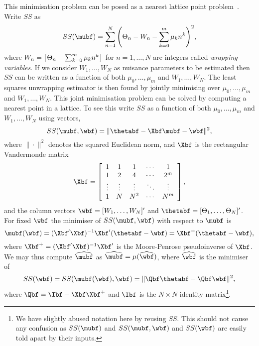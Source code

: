 \documentclass[journal]{IEEEtran}
\begin{document}
This minimisation problem can be posed as a nearest lattice point problem~\cite{McKilliam2009asilomar_polyest_lattice, McKilliam2010thesis}.  Write $SS$ as
\[
SS(\mubf) = \sum_{n=1}^{N}{ \left( \Theta_{n} - W_n - \sum_{k = 0}^{m}{\mu_k n^k} \right)^2 },
\]
where $W_n = {\left\lceil \Theta_{n} - \sum_{k = 0}^{m}{\mu_k n^k}  \right\rfloor}$ for $n = 1, \dots, N$ are integers called \emph{wrapping variables}.  If we consider $W_1,\dots,W_N$ as nuisance parameters to be estimated then $SS$ can be written as a function of both $\mu_0,\dots,\mu_m$ and $W_1,\dots,W_N$.  The least squares unwrapping estimator is then found by jointly minimising over $\mu_0,\dots,\mu_m$ and $W_1,\dots,W_N$.   This joint minimisation problem can be solved by computing a nearest point in a lattice.  To see this write $SS$ as a function of both $\mu_0,\dots,\mu_m$ and $W_1,\dots,W_N$ using vectors,
\begin{equation}\label{eq:SS_in_vector_form_with_u_nuisance}
SS(\mubf, \wbf) = \| \thetabf - \Xbf\mubf - \wbf \|^2,
\end{equation}
where $\|\cdot\|^2$ denotes the squared Euclidean norm, and $\Xbf$ is the rectangular Vandermonde matrix
\begin{equation}\label{eq:Xvandermonde}
\Xbf = \left[ \begin{array}{ccccc} 
1 & 1 & 1 & \cdots & 1 \\
1 & 2 & 4 & \cdots & 2^m \\
\vdots & \vdots  & \vdots & \ddots & \vdots \\
1 & N & N^2 & \cdots & N^m \\
\end{array} \right],
\end{equation}
and the column vectors $\wbf = [W_1, \dots, W_N]^\prime$ and $\thetabf = [\Theta_1, \dots, \Theta_N]^\prime$.   For fixed $\wbf$ the minimiser of $SS(\mubf, \wbf)$ with respect to $\mubf$ is
\begin{equation} \label{eq:hat_theta_cal}
\mubf(\wbf) = (\Xbf^\prime\Xbf)^{-1}\Xbf^\prime( \thetabf - \wbf) = \Xbf^+( \thetabf - \wbf),
\end{equation}
where $\Xbf^+ = (\Xbf^\prime\Xbf)^{-1}\Xbf^\prime$ is the Moore-Penrose pseudoinverse of $\Xbf$.  We may thus compute $\widehat{\mubf}$ as $\widehat{\mubf} = \mu(\widehat{\wbf})$, where $\widehat{\wbf}$ is the minimiser of
\[
SS(\wbf) = SS(\mubf(\wbf),\wbf) = \| \Qbf\thetabf - \Qbf\wbf \|^2,
\]
where $\Qbf = \Ibf - \Xbf\Xbf^+$ and $\Ibf$ is the $N \times N$ identity matrix\footnote{We have slightly abused notation here by reusing $SS$. This should not cause any confusion as $SS(\mubf)$ and $SS(\mubf,\wbf)$ and $SS(\wbf)$ are easily told apart by their inputs.}. 
\end{document}
